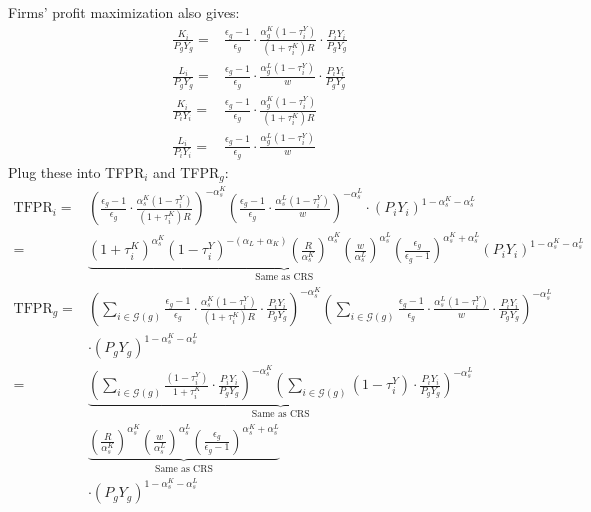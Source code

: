 \documentclass[12pt]{article}
\begin{document}
Firms' profit maximization also gives:
\begin{align*}
\frac{K_i}{P_gY_g}=&\frac{\epsilon_g-1}{\epsilon_g}\cdot \frac{\alpha_g^K(1-\tau_i^Y)}{(1+\tau_i^K)R} \cdot \frac{P_iY_i}{P_gY_g}\\
\frac{L_i}{P_gY_g}=&\frac{\epsilon_g-1}{\epsilon_g}\cdot \frac{\alpha^L_g(1-\tau_i^Y)}{w} \cdot \frac{P_iY_i}{P_gY_g}\\
\frac{K_i}{P_iY_i}=&\frac{\epsilon_g-1}{\epsilon_g}\cdot \frac{\alpha^K_g(1-\tau_i^Y)}{(1+\tau_i^K)R}\\
\frac{L_i}{P_iY_i}=&\frac{\epsilon_g-1}{\epsilon_g}\cdot \frac{\alpha^L_g(1-\tau_i^Y)}{w}
\end{align*}
Plug these into TFPR$_i$ and TFPR$_g$:
\begin{align*}
\text{TFPR}_i=&\left( \frac{\epsilon_g-1}{\epsilon_g}\cdot \frac{\alpha^K_s(1-\tau_i^Y)}{(1+\tau_i^K)R} \right)^{-\alpha^K_s} \left( \frac{\epsilon_g-1}{\epsilon_g}\cdot \frac{\alpha^L_s(1-\tau_i^Y)}{w} \right)^{-\alpha^L_s} \cdot (P_iY_i)^{1-\alpha^K_s-\alpha^L_s}\\
=&\underbrace{(1+\tau_i^K)^{\alpha^K_s}(1-\tau_i^Y)^{-(\alpha_L+\alpha_K)}\left( \frac{R}{\alpha^K_s} \right)^{\alpha^K_s} \left( \frac{w}{\alpha^L_s} \right)^{\alpha^L_s} \left( \frac{\epsilon_g}{\epsilon_g-1} \right)^{\alpha^K_s+\alpha^L_s}}_{\text{Same as CRS}}(P_iY_i)^{1-\alpha^K_s-\alpha^L_s}\\
\text{TFPR}_g=&\left( \sum_{i \in \mathcal{G}(g)} \frac{\epsilon_g-1}{\epsilon_g}\cdot \frac{\alpha^K_s(1-\tau_i^Y)}{(1+\tau_i^K)R} \cdot \frac{P_iY_i}{P_gY_g} \right)^{-\alpha^K_s} \left( \sum_{i \in \mathcal{G}(g)} \frac{\epsilon_g-1}{\epsilon_g}\cdot \frac{\alpha^L_s(1-\tau_i^Y)}{w} \cdot \frac{P_iY_i}{P_gY_g} \right)^{-\alpha^L_s} \\
&\cdot (P_gY_g)^{1-\alpha^K_s-\alpha^L_s}\\
=&\underbrace{\left( \sum_{i \in \mathcal{G}(g)}\frac{(1-\tau_i^Y)}{1+\tau_i^K} \cdot \frac{P_iY_i}{P_gY_g} \right)^{-\alpha^K_s} \left( \sum_{i \in \mathcal{G}(g)}(1-\tau_i^Y) \cdot \frac{P_iY_i}{P_gY_g} \right)^{-\alpha^L_s}}_{\text{Same as CRS}} \\
& \underbrace{\left( \frac{R}{\alpha^K_s} \right)^{\alpha^K_s} \left( \frac{w}{\alpha^L_s} \right)^{\alpha^L_s}\left( \frac{\epsilon_g}{\epsilon_g-1} \right)^{\alpha^K_s+\alpha^L_s}}_{\text{Same as CRS}}\\
& \cdot (P_gY_g)^{1-\alpha^K_s-\alpha^L_s}
\end{align*}
\end{document}
